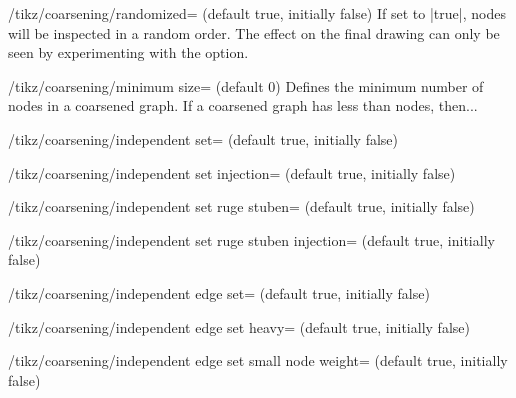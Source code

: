 \begin{key}{/tikz/coarsening/randomized= (default
  true, initially false)}
  If set to |true|, nodes will be inspected in a random order. The
  effect on the final drawing can only be seen by experimenting with the
  option.
  \begin{codeexample}[]
  \end{codeexample}
\end{key}

\begin{key}{/tikz/coarsening/minimum size= (default 0)}
  Defines the minimum number of nodes in a coarsened graph. If a
  coarsened graph has less than  nodes, then... %
  \begin{codeexample}[] 
  \end{codeexample}
\end{key}

\begin{key}{/tikz/coarsening/independent set=
  (default true, initially false)}
\end{key}

\begin{key}{/tikz/coarsening/independent set injection=
  (default true, initially false)}
\end{key}

\begin{key}{/tikz/coarsening/independent set ruge stuben=
  (default true, initially false)}
\end{key}

\begin{key}{/tikz/coarsening/independent set ruge stuben injection=
  (default true, initially false)}
\end{key}

\begin{key}{/tikz/coarsening/independent edge set=
  (default true, initially false)}
\end{key}

\begin{key}{/tikz/coarsening/independent edge set heavy=
  (default true, initially false)}
\end{key}

\begin{key}{/tikz/coarsening/independent edge set small node weight=
  (default true, initially false)}
\end{key}

